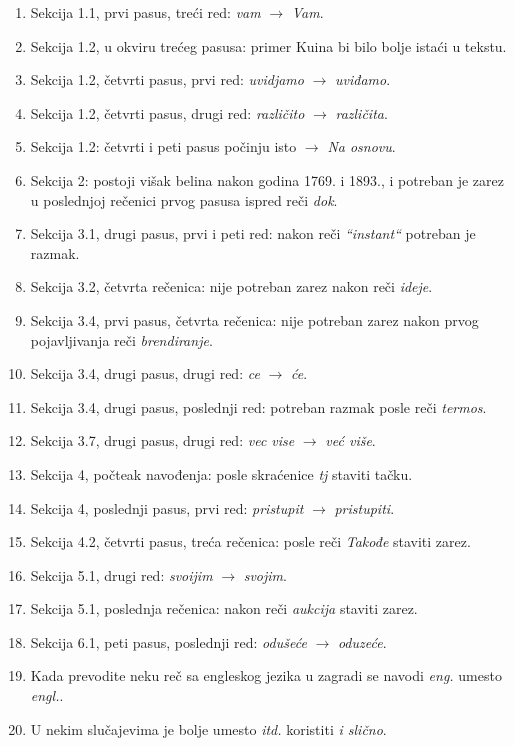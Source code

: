 \documentclass[a4paper]{report}
\begin{document}
\begin{enumerate}
\item Sekcija 1.1, prvi pasus, treći red: \emph{vam} $\rightarrow$ \emph{Vam}.
\item Sekcija 1.2, u okviru trećeg pasusa: primer Kuina bi bilo bolje istaći u tekstu.
\item Sekcija 1.2, četvrti pasus, prvi red: \emph{uvidjamo} $\rightarrow$ \emph{uviđamo}.
\item Sekcija 1.2, četvrti pasus, drugi red: \emph{različito} $\rightarrow$ \emph{različita}.
\item Sekcija 1.2: četvrti i peti pasus počinju isto $\rightarrow$ \emph{Na osnovu}.
\item Sekcija 2: postoji višak belina nakon godina 1769. i 1893., i potreban je zarez u poslednjoj rečenici prvog pasusa ispred reči \emph{dok}.
\item Sekcija 3.1, drugi pasus, prvi i peti red: nakon reči \emph{``instant``} potreban je razmak.
\item Sekcija 3.2, četvrta rečenica: nije potreban zarez nakon reči \emph{ideje}.
\item Sekcija 3.4, prvi pasus, četvrta rečenica: nije potreban zarez nakon prvog pojavljivanja reči \emph{brendiranje}.
\item Sekcija 3.4, drugi pasus, drugi red: \emph{ce} $\rightarrow$ \emph{će}.
\item Sekcija 3.4, drugi pasus, poslednji red:  potreban razmak posle reči \emph{termos}.
\item Sekcija 3.7, drugi pasus, drugi red: \emph{vec vise} $\rightarrow$ \emph{već više}.
\item Sekcija 4, počteak navođenja:  posle skraćenice \emph{tj} staviti tačku.
\item Sekcija 4, poslednji pasus, prvi red: \emph{pristupit} $\rightarrow$ \emph{pristupiti}.
\item Sekcija 4.2, četvrti pasus, treća rečenica: posle reči \emph{Takođe} staviti zarez.
\item Sekcija 5.1, drugi red:  \emph{svoijim} $\rightarrow$ \emph{svojim}.
\item Sekcija 5.1, poslednja rečenica: nakon reči \emph{aukcija} staviti zarez.
\item Sekcija 6.1, peti pasus, poslednji red: \emph{odušeće} $\rightarrow$ \emph{oduzeće}.
\item Kada prevodite neku reč sa engleskog jezika u zagradi se navodi \emph{eng.} umesto \emph{engl.}.
\item U nekim slučajevima je bolje umesto \emph{itd.} koristiti \emph{i slično}.
\end{enumerate}
\end{document}
